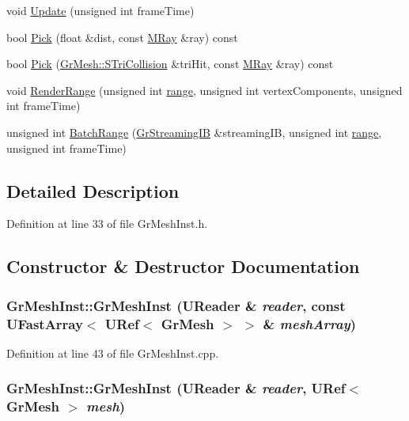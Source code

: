 \begin{CompactItemize}
\item 
void \hyperlink{class_gr_mesh_inst_4dbbdac352eec02a919c9d7c449663b3}{Update} (unsigned int frameTime)
\item 
bool \hyperlink{class_gr_mesh_inst_5c7494299c0668f3114a1bccb8722bf2}{Pick} (float \&dist, const \hyperlink{class_m_ray}{MRay} \&ray) const 
\item 
bool \hyperlink{class_gr_mesh_inst_35ce724ce4bdf76802f3f3a846b499f8}{Pick} (\hyperlink{struct_gr_mesh_1_1_s_tri_collision}{GrMesh::STriCollision} \&triHit, const \hyperlink{class_m_ray}{MRay} \&ray) const 
\item 
void \hyperlink{class_gr_mesh_inst_ca05d2e8e1fbaecd7902301797a1586b}{RenderRange} (unsigned int \hyperlink{glext__bak_8h_7b8ad0b27a927682837f95528fa454f5}{range}, unsigned int vertexComponents, unsigned int frameTime)
\item 
unsigned int \hyperlink{class_gr_mesh_inst_cc009c82642378bb9e6640fe329b0584}{BatchRange} (\hyperlink{class_gr_streaming_i_b}{GrStreamingIB} \&streamingIB, unsigned int \hyperlink{glext__bak_8h_7b8ad0b27a927682837f95528fa454f5}{range}, unsigned int frameTime)
\end{CompactItemize}


\subsection{Detailed Description}


Definition at line 33 of file GrMeshInst.h.

\subsection{Constructor \& Destructor Documentation}
\hypertarget{class_gr_mesh_inst_cefd284db81d59a5b3a5ec94c264bbc6}{
\subsubsection[{GrMeshInst}]{\setlength{\rightskip}{0pt plus 5cm}GrMeshInst::GrMeshInst ({\bf UReader} \& {\em reader}, \/  const {\bf UFastArray}$<$ {\bf URef}$<$ {\bf GrMesh} $>$ $>$ \& {\em meshArray})}}
\label{class_gr_mesh_inst_cefd284db81d59a5b3a5ec94c264bbc6}




Definition at line 43 of file GrMeshInst.cpp.\hypertarget{class_gr_mesh_inst_151b8cdec16292044f816c74e6d24728}{
\subsubsection[{GrMeshInst}]{\setlength{\rightskip}{0pt plus 5cm}GrMeshInst::GrMeshInst ({\bf UReader} \& {\em reader}, \/  {\bf URef}$<$ {\bf GrMesh} $>$ {\em mesh})}}
\label{class_gr_mesh_inst_151b8cdec16292044f816c74e6d24728}




